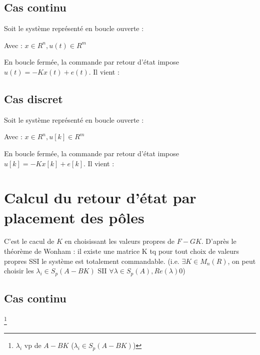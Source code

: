 \subsection{Cas continu}
\large{Soit le système représenté en boucle ouverte :}
\begin{center}
     \newline 
    
    Avec : $x \in R^{n}, u(t) \in R^{m}$
\end{center}
\large{En boucle fermée, la commande par retour d'état impose $ u(t) = -Kx(t) + e(t)$. Il vient :}
\begin{center}
\end{center}
\subsection{Cas discret}
\large{Soit le système représenté en boucle ouverte :}
\begin{center}
     \newline 
    
    Avec : $x \in R^{n}, u[k] \in R^{m}$
\end{center}
\large{En boucle fermée, la commande par retour d'état impose $ u[k] = -Kx[k] + e[k]$. Il vient :}
\begin{center}
\end{center}
\newpage
\section{Calcul du retour d'état par placement des pôles}
\large{C'est le cacul de $K$ en choisissant les valeurs propres de $F - GK$. D'après le \textcolor{BrickRed}{théorème de Wonham : il existe une matrice K tq pour tout choix de valeurs propres SSI le système est totalement commandable.} \newline
(i.e. $\exists K \in M_{n}(R)$, on peut choisir les $\lambda_{i} \in S_{p}(A - BK)$ SII $\forall \lambda \in S_{p}(A), Re(\lambda) 0$)}
\subsection{Cas continu}
\begin{center}
     \footnote{$\lambda_{i}$ vp de $A - BK$ ($\lambda_{i} \in S_{p}(A-BK)$)}
\end{center}

